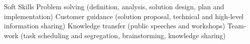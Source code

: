 \begin{cvskills}
    
  \cvskill
{Soft Skills} %
{Problem solving (definition, analysis, solution design, plan and implementation)}
  \cvskill
{} %
  {Customer guidance (solution proposal, technical and high-level information sharing)}
\cvskill
{}
{Knowledge transfer (public speeches and workshops)}
\cvskill
{}
{Team-work (task scheduling and segregation, brainstorming, knowledge sharing)} %

\end{cvskills}

